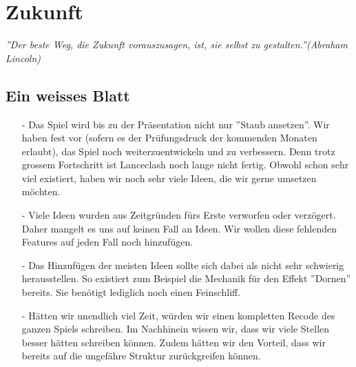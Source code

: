\chapter{Zukunft}
\textit{''Der beste Weg, die Zukunft vorauszusagen, ist, sie selbst zu gestalten.''(Abraham Lincoln)}

\section{Ein weisses Blatt}
\begin{itemize}
    \item[-] Das Spiel wird bis zu der Präsentation nicht nur ''Staub ansetzen''. Wir haben fest vor (sofern es der Prüfungsdruck der kommenden Monaten erlaubt), das Spiel noch weiterzuentwickeln und zu verbessern. Denn trotz grossem Fortschritt
    ist Lanceclash noch lange nicht fertig. Obwohl schon sehr viel existiert, haben wir noch sehr viele Ideen, die wir gerne umsetzen möchten.
    \item[-] Viele Ideen wurden aus Zeitgründen fürs Erste verworfen oder verzögert. Daher mangelt es uns auf keinen Fall an Ideen. Wir wollen diese
    fehlenden Features auf jeden Fall noch hinzufügen.
    \item[-] Das Hinzufügen der meisten Ideen sollte sich dabei als nicht sehr schwierig herausstellen. So existiert zum Beispiel die Mechanik für den Effekt ''Dornen'' bereits. 
    Sie benötigt lediglich noch einen Feinschliff. 
    \item[-] Hätten wir unendlich viel Zeit, würden wir einen kompletten Recode des ganzen Spiels schreiben. Im Nachhinein wissen wir, dass wir viele Stellen besser hätten schreiben können. 
    Zudem hätten wir den Vorteil, dass wir bereits auf die ungefähre Struktur zurückgreifen können. 
\end{itemize}

